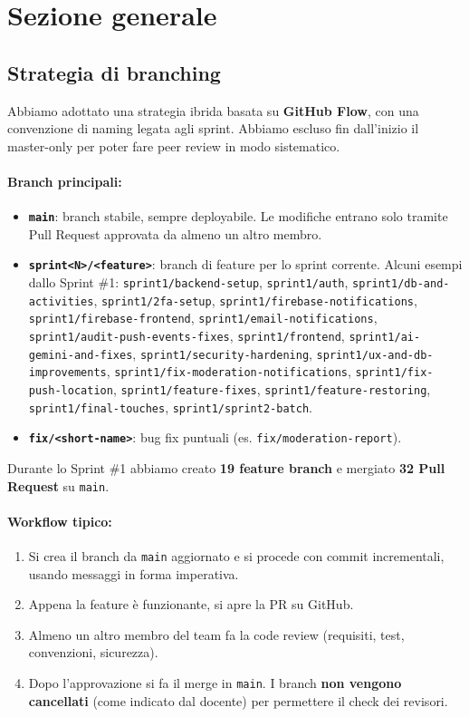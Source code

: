 \documentclass[11pt,a4paper]{article}
\newcommand{\code}[1]{\texttt{\small#1}}
\begin{document}
  \section{Sezione generale}

  \subsection{Strategia di branching}
  Abbiamo adottato una strategia ibrida basata su \textbf{GitHub Flow}, con una convenzione di
  naming legata agli sprint. Abbiamo escluso fin dall'inizio il master-only per poter fare peer
  review in modo sistematico.

  \paragraph{Branch principali:}
  \begin{itemize}
    \item \textbf{\code{main}}: branch stabile, sempre deployabile. Le modifiche entrano solo
    tramite Pull Request approvata da almeno un altro membro.
    \item \textbf{\code{sprint<N>/<feature>}}: branch di feature per lo sprint corrente.
    Alcuni esempi dallo Sprint \#1: \code{sprint1/backend-setup}, \code{sprint1/auth},
    \code{sprint1/db-and-activities}, \code{sprint1/2fa-setup},
    \code{sprint1/firebase-notifications}, \code{sprint1/firebase-frontend},
    \code{sprint1/email-notifications}, \code{sprint1/audit-push-events-fixes},
    \code{sprint1/frontend}, \code{sprint1/ai-gemini-and-fixes},
    \code{sprint1/security-hardening}, \code{sprint1/ux-and-db-improvements},
    \code{sprint1/fix-moderation-notifications}, \code{sprint1/fix-push-location},
    \code{sprint1/feature-fixes}, \code{sprint1/feature-restoring},
    \code{sprint1/final-touches}, \code{sprint1/sprint2-batch}.
    \item \textbf{\code{fix/<short-name>}}: bug fix puntuali (es. \code{fix/moderation-report}).
  \end{itemize}
  Durante lo Sprint \#1 abbiamo creato \textbf{19 feature branch} e mergiato
  \textbf{32 Pull Request} su \code{main}.

  \paragraph{Workflow tipico:}
  \begin{enumerate}
    \item Si crea il branch da \code{main} aggiornato e si procede con commit incrementali,
    usando messaggi in forma imperativa.
    \item Appena la feature \`{e} funzionante, si apre la PR su GitHub.
    \item Almeno un altro membro del team fa la code review (requisiti, test, convenzioni,
    sicurezza).
    \item Dopo l'approvazione si fa il merge in \code{main}. I branch \textbf{non vengono
    cancellati} (come indicato dal docente) per permettere il check dei revisori.
  \end{enumerate}
\end{document}
